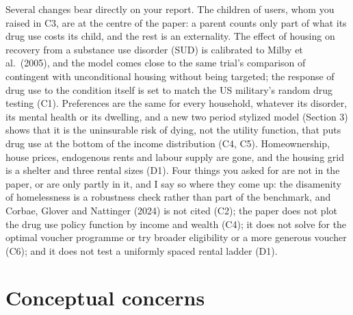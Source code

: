\documentclass[11pt]{article}
\begin{document}
{Several changes bear directly on your report. The children of users, whom you raised in
C3, are at the centre of the paper: a parent counts only part of what its drug use costs
its child, and the rest is an externality. The effect of housing on recovery from a
substance use disorder (SUD) is calibrated to Milby et al.\ (2005), and the model comes
close to the same trial's comparison of contingent with unconditional housing without being
targeted; the response of drug use to the condition itself is set to match the US
military's random drug testing (C1). Preferences are the same for every household, whatever
its disorder, its mental health or its dwelling, and a new two period stylized model
(Section 3) shows that it is the uninsurable risk of dying, not the utility function, that
puts drug use at the bottom of the income distribution (C4, C5). Homeownership, house
prices, endogenous rents and labour supply are gone, and the housing grid is a shelter and
three rental sizes (D1). Four things you asked for are not in the paper, or are only partly
in it, and I say so where they come up: the disamenity of homelessness is a robustness
check rather than part of the benchmark, and Corbae, Glover and Nattinger (2024) is not
cited (C2); the paper does not plot the drug use policy function by income and wealth (C4);
it does not solve for the optimal voucher programme or try broader eligibility or a more
generous voucher (C6); and it does not test a uniformly spaced rental ladder (D1).
}

\section*{Conceptual concerns}
\end{document}
